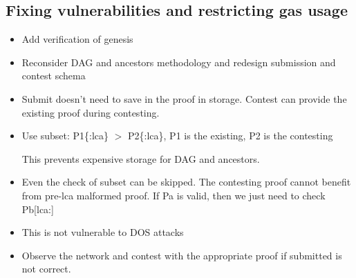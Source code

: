 \subsection{Fixing vulnerabilities and restricting gas usage}

\begin{itemize}

    \item
        Add verification of genesis
    \item
        Reconsider DAG and ancestors methodology and redesign submission and
        contest schema
    \item
        Submit doesn't need to save in the proof in storage. Contest can
        provide the existing proof during contesting.

    \item
        Use subset: P1\{:lca\} $>$ P2\{:lca\}, P1 is the existing, P2 is the
        contesting

        This prevents expensive storage for DAG and ancestors.

    \item
        Even the check of subset can be skipped. The contesting proof cannot
        benefit from pre-lca malformed proof. If Pa is valid, then we just
        need to check Pb[lca:]

    \item
        This is not vulnerable to DOS attacks

    \item
        Observe the network and contest with the appropriate proof if
        submitted is not correct.

\end{itemize}

\pagebreak
